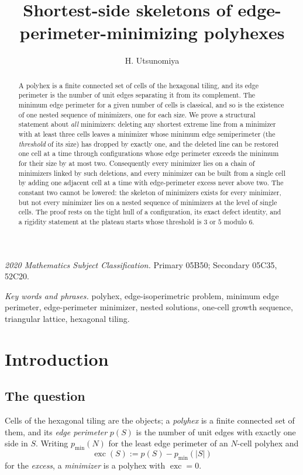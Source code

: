 \documentclass[11pt]{article}
\title{Shortest-side skeletons of edge-perimeter-minimizing polyhexes}
\author{H. Utsunomiya}
\date{}
\theoremstyle{plain}
\theoremstyle{definition}
\theoremstyle{remark}
\DeclareMathOperator{\exc}{exc}
\begin{document}
\maketitle

\begin{abstract}
A polyhex is a finite connected set of cells of the hexagonal tiling, and its edge perimeter
is the number of unit edges separating it from its complement. The minimum edge perimeter
for a given number of cells is classical, and so is the existence of one nested sequence of
minimizers, one for each size. We prove a structural statement about \emph{all} minimizers:
deleting any shortest extreme line from a minimizer with at least three cells leaves a
minimizer whose minimum edge semiperimeter (the \emph{threshold} of its size) has dropped
by exactly one, and the deleted line can be restored
one cell at a time through configurations whose edge perimeter exceeds the minimum for
their size by at most two. Consequently every minimizer lies on a chain of minimizers linked
by such deletions, and every minimizer can be built from a single cell by adding one
adjacent cell at a time with edge-perimeter excess never above two. The constant two cannot
be lowered: the skeleton of minimizers exists for every minimizer, but not every minimizer
lies on a nested sequence of minimizers at the level of single cells. The proof rests on the
tight hull of a configuration, its exact defect identity, and a rigidity statement at the
plateau starts whose threshold is \(3\) or \(5\) modulo \(6\).
\end{abstract}

\noindent\textit{2020 Mathematics Subject Classification.} Primary 05B50; Secondary 05C35,
52C20.

\noindent\textit{Key words and phrases.} polyhex, edge-isoperimetric problem, minimum edge
perimeter, edge-perimeter minimizer, nested solutions, one-cell growth sequence, triangular
lattice, hexagonal tiling.

\section{Introduction}\label{sec:intro}

\subsection{The question}\label{sec:0.1}

Cells of the hexagonal tiling are the objects; a \emph{polyhex} is a finite connected set of
them, and its \emph{edge perimeter} \(p(S)\) is the number of unit edges with exactly one
side in \(S\). Writing \(p_{\min}(N)\) for the least edge perimeter of an \(N\)-cell
polyhex and
\[
   \exc(S):=p(S)-p_{\min}(|S|)
\]
for the \emph{excess}, a \emph{minimizer} is a polyhex with \(\exc=0\).
\end{document}
